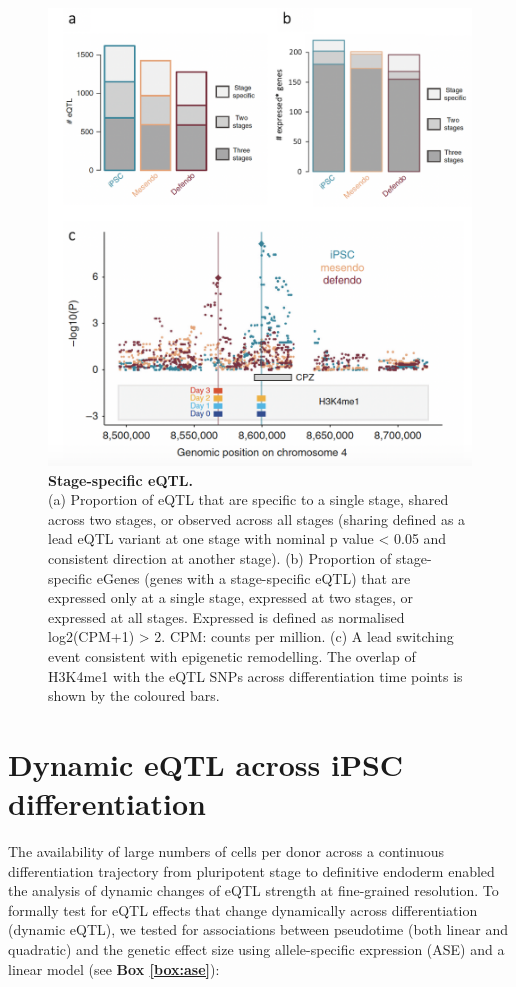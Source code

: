 \begin{figure}[htbp]
\centering
\includegraphics[width=12cm]{Chapter4/Fig/endodiff_stage_specific.png}
\caption[Stage-specific eQTL]{\textbf{Stage-specific eQTL.}\\
(a) Proportion of eQTL that are specific to a single stage, shared across two
stages, or observed across all stages (sharing defined as a lead eQTL variant at one stage with nominal p value < 0.05 and consistent direction
at another stage).
(b) Proportion of stage-specific eGenes (genes with a stage-specific eQTL) that are expressed only at a single stage, expressed at two stages, or expressed at all stages. 
Expressed is defined as normalised log2(CPM+1) > 2. 
CPM: counts per million.
(c) A lead switching event consistent with epigenetic remodelling. 
The overlap of H3K4me1 with the eQTL SNPs across differentiation time points is shown by the coloured bars.}
\label{fig:endodiff_stage_specific_eqtl}
\end{figure}

\newpage

\section{Dynamic eQTL across iPSC differentiation}
\label{sec:endodiff_dynamic_eqtl}

The availability of large numbers of cells per donor across a continuous differentiation trajectory from pluripotent stage to definitive endoderm enabled the analysis of dynamic changes of eQTL strength at fine-grained resolution. 
To formally test for eQTL effects that change dynamically across differentiation (dynamic eQTL), we tested for associations between pseudotime (both linear and quadratic) and the genetic effect size using allele-specific expression (ASE) and a linear model (see \textbf{Box \ref{box:ase}}):

